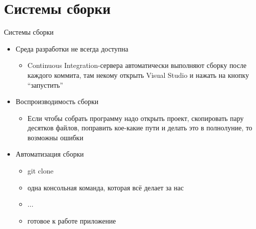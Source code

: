 \documentclass{../../slides-style}
\begin{document}
    \section{Системы сборки}

    \begin{frame}{Системы сборки}
        \begin{itemize}
            \item Среда разработки не всегда доступна
            \begin{itemize}
                \item Continuous Integration-сервера автоматически выполняют сборку после каждого коммита, там некому открыть Visual Studio и нажать на кнопку \enquote{запустить}
            \end{itemize}
            \item Воспроизводимость сборки
            \begin{itemize}
                \item Если чтобы собрать программу надо открыть проект, скопировать пару десятков файлов, поправить кое-какие пути и делать это в полнолуние, то возможны ошибки
            \end{itemize}
            \item Автоматизация сборки
            \begin{itemize}
                \item git clone
                \item одна консольная команда, которая всё делает за нас
                \item ...
                \item готовое к работе приложение
            \end{itemize}
        \end{itemize}
    \end{frame}
\end{document}
